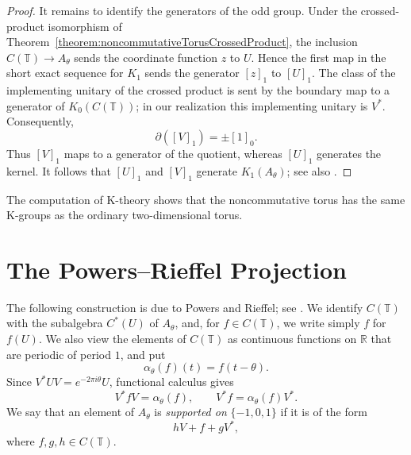 \documentclass{book}
\begin{document}
\begin{proof}
It remains to identify the generators of the odd group. Under the
crossed-product isomorphism of
Theorem~\ref{theorem:noncommutativeTorusCrossedProduct}, the inclusion
\(C(\mathbb T)\to A_\theta\) sends the coordinate function \(z\) to \(U\).
Hence the first map in the short exact sequence for \(K_1\) sends the
generator \([z]_1\) to \([U]_1\). The class of the implementing unitary of
the crossed product is sent by the boundary map to a generator of
\(K_0(C(\mathbb T))\); in our realization this implementing unitary is
\(V^*\). Consequently,
\[
  \partial([V]_1)=\pm[1]_0.
\]
Thus \([V]_1\) maps to a generator of the quotient, whereas \([U]_1\)
generates the kernel. It follows that \([U]_1\) and \([V]_1\) generate
\(K_1(A_\theta)\); see also
\cite[Example~VIII.5.2]{Davidson1996}.
\end{proof}

The computation of K-theory shows that the noncommutative torus has the same K-groups as the ordinary two-dimensional torus.

\section{The Powers--Rieffel Projection}
The following construction is due to Powers and Rieffel; see
\cite[Theorem~1.1]{Rieffel1981}. We identify \(C(\mathbb{T})\) with
the subalgebra \(C^*(U)\) of \(A_\theta\), and, for \(f\in C(\mathbb{T})\),
we write simply \(f\) for \(f(U)\). We also view the elements of
\(C(\mathbb{T})\) as continuous functions on \(\mathbb{R}\) that are
periodic of period \(1\), and put
\[
  \alpha_\theta(f)(t)=f(t-\theta).
\]
Since \(V^*UV=e^{-2\pi i\theta}U\), functional calculus gives
\[
  V^*fV=\alpha_\theta(f),
  \qquad
  V^*f=\alpha_\theta(f)V^*.
\]
We say that an element of \(A_\theta\) is \textit{supported on}
\(\{-1,0,1\}\) if it is of the form
\[
  hV+f+gV^*,
\]
where \(f,g,h\in C(\mathbb{T})\).
\end{document}
